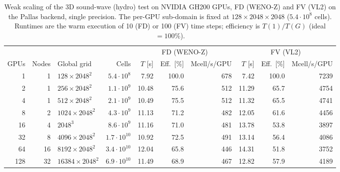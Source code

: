 \begin{table}
    \centering
    \small
    \setlength{\tabcolsep}{4pt}
    \caption{Weak scaling of the 3D sound-wave (hydro) test on NVIDIA GH200
    GPUs, FD (WENO-Z) and FV (VL2) on the Pallas backend, single precision.
    The per-GPU sub-domain is fixed at $128\times2048\times2048$
    ($5.4\cdot10^{8}$ cells).  Runtimes are the warm execution of 10 (FD)
    or 100 (FV) time steps; efficiency is $T(1)/T(G)$ (ideal $=100\%$).}
    \label{tab:weak_scaling_hydro}
    \begin{tabular}{rrlrrrrrrr}
        \toprule
        & & & & \multicolumn{3}{c}{FD (WENO-Z)} & \multicolumn{3}{c}{FV (VL2)} \\
        \cmidrule(lr){5-7}\cmidrule(lr){8-10}
        GPUs & Nodes & Global grid & Cells & $T$ [s] & Eff.\ [\%] & Mcell/s/GPU & $T$ [s] & Eff.\ [\%] & Mcell/s/GPU \\
        \midrule
        1 & 1 & $128\times2048^{2}$ & $5.4\cdot10^{8}$ & 7.92 & 100.0 & 678 & 7.42 & 100.0 & 7239 \\
        2 & 1 & $256\times2048^{2}$ & $1.1\cdot10^{9}$ & 10.48 & 75.6 & 512 & 11.29 & 65.7 & 4754 \\
        4 & 1 & $512\times2048^{2}$ & $2.1\cdot10^{9}$ & 10.49 & 75.5 & 512 & 11.32 & 65.5 & 4741 \\
        8 & 2 & $1024\times2048^{2}$ & $4.3\cdot10^{9}$ & 11.13 & 71.2 & 482 & 12.05 & 61.6 & 4456 \\
        16 & 4 & $2048^{3}$ & $8.6\cdot10^{9}$ & 11.16 & 71.0 & 481 & 13.78 & 53.8 & 3897 \\
        32 & 8 & $4096\times2048^{2}$ & $1.7\cdot10^{10}$ & 10.92 & 72.5 & 491 & 13.14 & 56.4 & 4086 \\
        64 & 16 & $8192\times2048^{2}$ & $3.4\cdot10^{10}$ & 12.04 & 65.8 & 446 & 14.31 & 51.8 & 3752 \\
        128 & 32 & $16384\times2048^{2}$ & $6.9\cdot10^{10}$ & 11.49 & 68.9 & 467 & 12.82 & 57.9 & 4189 \\
        \bottomrule
    \end{tabular}
\end{table}

